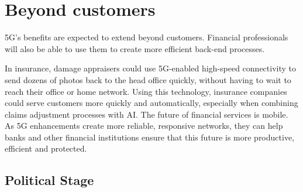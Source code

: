 \section{Beyond customers}
5G’s benefits are expected to extend beyond customers. Financial professionals will also be able to use them to create more efficient back-end processes.
\item In insurance, damage appraisers could use 5G-enabled high-speed connectivity to send dozens of photos back to the head office quickly, without having to wait to reach their office or home network. Using this technology, insurance companies could serve customers more quickly and automatically, especially when combining claims adjustment processes with AI.
The future of financial services is mobile. As 5G enhancements create more reliable, responsive networks, they can help banks and other financial institutions ensure that this future is more productive, efficient and protected.


\subsection{Political Stage}

